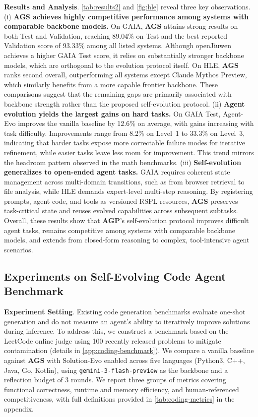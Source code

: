 \documentclass{article}
\theoremstyle{plain}
\theoremstyle{definition}
\theoremstyle{remark}
\newcommand{\projectname}{\textbf{\textsc{AGP}}\xspace}
\newcommand{\projectnameAgent}{\textbf{\textsc{AGS}}\xspace}
\begin{document}
\textbf{Results and Analysis}. \cref{tab:results2} and \cref{fig:hle} reveal three key observations. 
(i) \textbf{\projectnameAgent achieves highly competitive performance among systems with comparable backbone models.} 
On GAIA, \projectnameAgent attains strong results on both Test and Validation, reaching 89.04\% on Test and the best reported Validation score of 93.33\% among all listed systems. Although openJiuwen achieves a higher GAIA Test score, it relies on substantially stronger backbone models, which are orthogonal to the evolution protocol itself. On HLE, \projectnameAgent ranks second overall, outperforming all systems except Claude Mythos Preview, which similarly benefits from a more capable frontier backbone. These comparisons suggest that the remaining gaps are primarily associated with backbone strength rather than the proposed self-evolution protocol. (ii) \textbf{Agent evolution yields the largest gains on hard tasks.} On GAIA Test, Agent-Evo improves the vanilla baseline by 12.6\% on average, with gains increasing with task difficulty. Improvements range from 8.2\% on Level~1 to 33.3\% on Level~3, indicating that harder tasks expose more correctable failure modes for iterative refinement, while easier tasks leave less room for improvement. This trend mirrors the headroom pattern observed in the math benchmarks. (iii) \textbf{Self-evolution generalizes to open-ended agent tasks.} 
GAIA requires coherent state management across multi-domain transitions, such as from browser retrieval to file analysis, while HLE demands expert-level multi-step reasoning. By registering prompts, agent code, and tools as versioned RSPL resources, \projectnameAgent preserves task-critical state and reuses evolved capabilities across subsequent subtasks. Overall, these results show that \projectname's self-evolution protocol improves difficult agent tasks, remains competitive among systems with comparable backbone models, and extends from closed-form reasoning to complex, tool-intensive agent scenarios.

\vspace{-0.4cm}
\subsection{Experiments on Self-Evolving Code Agent Benchmark}
\vspace{-0.2cm}

\textbf{Experiment Setting}. Existing code generation benchmarks evaluate one-shot generation and do not measure an agent's ability to iteratively improve solutions during inference. To address this, we construct a benchmark based on the LeetCode online judge using 100 recently released problems to mitigate contamination (details in \cref{app:coding-benchmark}). We compare a vanilla baseline against \projectnameAgent with Solution-Evo enabled across five languages (Python3, C++, Java, Go, Kotlin), using \texttt{gemini-3-flash-preview} as the backbone and a reflection budget of 3 rounds. We report three groups of metrics covering functional correctness, runtime and memory efficiency, and human-referenced competitiveness, with full definitions provided in \cref{tab:coding-metrics} in the appendix.
\end{document}
